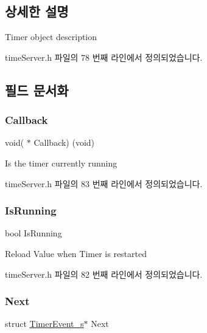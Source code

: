 \subsection{상세한 설명}
Timer object description 

time\+Server.\+h 파일의 78 번째 라인에서 정의되었습니다.



\subsection{필드 문서화}
\mbox{\label{struct_timer_event__s_ad008a5ba5a1c8dea486486fae73fd421}} 
\subsubsection{\texorpdfstring{Callback}{Callback}}
{\footnotesize\ttfamily void( $\ast$ Callback) (void)}



Is the timer currently running 



time\+Server.\+h 파일의 83 번째 라인에서 정의되었습니다.

\mbox{\label{struct_timer_event__s_af5cb1246be24f89c7a5f720af0c92559}} 
\subsubsection{\texorpdfstring{Is\+Running}{IsRunning}}
{\footnotesize\ttfamily bool Is\+Running}



Reload Value when Timer is restarted 



time\+Server.\+h 파일의 82 번째 라인에서 정의되었습니다.

\mbox{\label{struct_timer_event__s_ab4d4ae1079c4e3d4842a2cdf30ffad86}} 
\subsubsection{\texorpdfstring{Next}{Next}}
{\footnotesize\ttfamily struct \mbox{\hyperlink{struct_timer_event__s}{Timer\+Event\+\_\+s}}$\ast$ Next}



